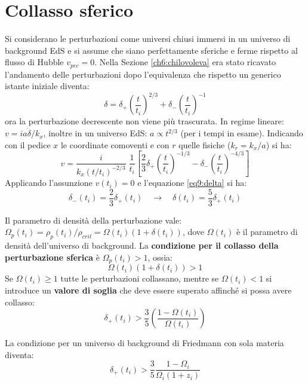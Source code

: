 \section{Collasso sferico}
Si considerano le perturbazioni come universi chiusi immersi in un universo di background EdS e si assume che siano perfettamente sferiche e ferme rispetto al flusso di Hubble $v_{pec}=0$. Nella Sezione \ref{ch6:chilovoleva} era stato ricavato l'andamento delle perturbazioni dopo l'equivalenza che rispetto un generico istante iniziale diventa:
\begin{equation}
    \delta = \delta_+ \left(\frac{t}{t_i}\right)^{2/3} + \delta_- \left(\frac{t}{t_i}\right)^{-1}\label{eq9:delta}
\end{equation}
ora la perturbazione decrescente non viene più trascurata. In regime lineare: $v = ia\dot{\delta}/k_x $, inoltre in un universo EdS: $a\propto t^{2/3}$ (per i tempi in esame). Indicando con il pedice $x$ le coordinate comoventi e con $r$ quelle fisiche ($k_r = k_x /a$) si ha: 
\begin{equation}
    v= \frac{i}{k_x \left(t/t_i\right)^{-2/3}}\;\frac{1}{t_i}\left[ \frac{2}{3}\delta_+ \left(\frac{t}{t_i}\right)^{-1/3} - \delta_- \left(\frac{t}{t_i}\right)^{-4/3}    \right]  
\end{equation}
Applicando l'assunzione $v(t_i)=0$ e l'equazione \ref{eq9:delta} si ha:
$$
\delta_- (t_i)= \frac{2}{3}\delta_+(t_i)\quad \rightarrow \quad \delta (t_i) = \frac{5}{3}\delta_+ (t_i)
$$

Il parametro di densità della perturbazione vale: $\Omega_p(t_i)=\rho_p(t_i) / \rho_{crit} = \Omega (t_i) (1+\delta(t_i))$, dove $\Omega (t_i)$ è il parametro di densità dell'universo di background. La \textbf{condizione per il collasso della perturbazione sferica} è $\Omega_p (t_i)>1$, ossia:
$$
\Omega (t_i) (1+\delta(t_i)) > 1
$$
Se $\Omega (t_i)\geq 1$ tutte le perturbazioni collassano, mentre se $\Omega (t_i)< 1$ si introduce un \textbf{valore di soglia} che deve essere superato affinché si possa avere collasso:
\begin{equation}
    \delta_+ (t_i) > \frac{3}{5}\left(\frac{1-\Omega (t_i)}{\Omega (t_i)}\right)
\end{equation}

La condizione per un universo di background di Friedmann con sola materia diventa:
$$
\delta_+ (t_i) > \frac{3}{5}\frac{1-\Omega_i}{\Omega_i (1+z_i)}
$$


